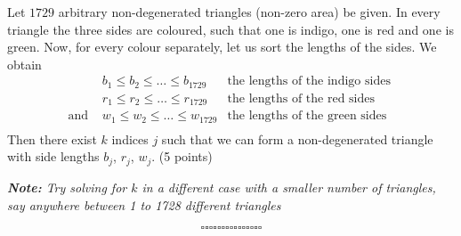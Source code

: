 \documentclass[12pt]{article}
\theoremstyle{definition}
\begin{document}
\begin{enumerate}
    Let $1729$ arbitrary non-degenerated triangles (non-zero area) be given. In every triangle the three sides are coloured, such that one is indigo, one is red and one is green. Now, for every colour separately, let us sort the lengths of the sides. We obtain
    \newline
    \[ \left. \begin{array}{rcl}
& b_1 \leq b_2\leq\ldots\leq b_{1729} & \textrm{the lengths of the indigo sides }\\
& r_1 \leq r_2\leq\ldots\leq r_{1729} & \textrm{the lengths of the red sides }\\
\textrm{and } & w_1 \leq w_2\leq\ldots\leq w_{1729} & \textrm{the lengths of the green sides }\\
\end{array}\right.\]
    \newline
    Then there exist $k$ indices $j$ such that we can form a non-degenerated triangle with side lengths $b_j$, $r_j$, $w_j$. (5 points)

    \textit{\textbf{Note:} Try solving for $k$ in a different case with a smaller number of triangles, say anywhere between 1 to 1728 different triangles}

\end{enumerate}
$$\square \square \square \square \square \square \square \square \square \square \square \square \square \square \square $$
\end{document}
